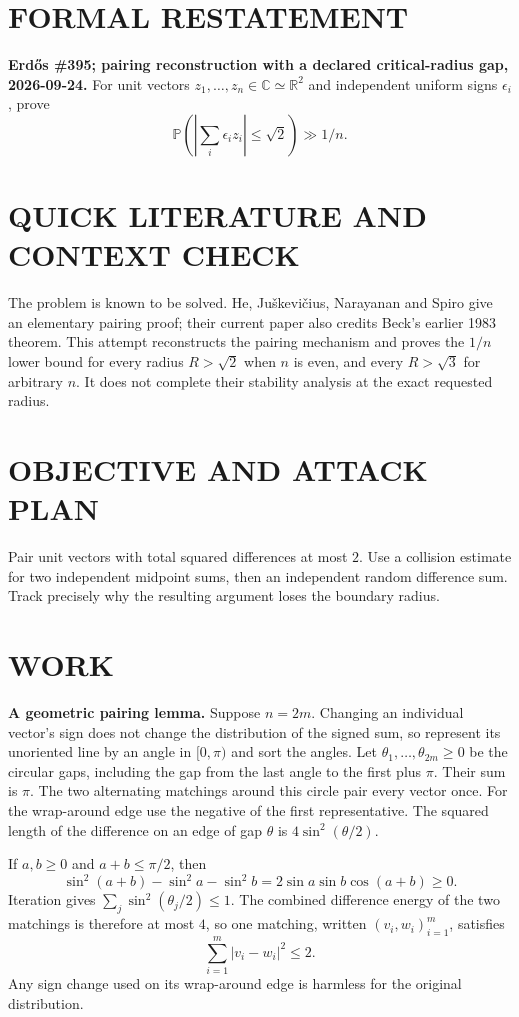 \section{FORMAL RESTATEMENT}
\textbf{Erd\H{o}s \#395; pairing reconstruction with a declared critical-radius gap, 2026-09-24.}
For unit vectors $z_1,\ldots,z_n\in\mathbb C\simeq\mathbb R^2$ and independent uniform signs $\epsilon_i$, prove
\[
\mathbb P\!\left(\left|\sum_i\epsilon_i z_i\right|\leq\sqrt2\right)\gg1/n.
\]

\section{QUICK LITERATURE AND CONTEXT CHECK}
The problem is known to be solved. He, Ju\v skevi\v cius, Narayanan and Spiro give an elementary pairing proof; their current paper also credits Beck's earlier 1983 theorem. This attempt reconstructs the pairing mechanism and proves the $1/n$ lower bound for every radius $R>\sqrt2$ when $n$ is even, and every $R>\sqrt3$ for arbitrary $n$. It does not complete their stability analysis at the exact requested radius.

\section{OBJECTIVE AND ATTACK PLAN}
Pair unit vectors with total squared differences at most $2$. Use a collision estimate for two independent midpoint sums, then an independent random difference sum. Track precisely why the resulting argument loses the boundary radius.

\section{WORK}
\textbf{A geometric pairing lemma.} Suppose $n=2m$. Changing an individual vector's sign does not change the distribution of the signed sum, so represent its unoriented line by an angle in $[0,\pi)$ and sort the angles. Let $\theta_1,\ldots,\theta_{2m}\geq0$ be the circular gaps, including the gap from the last angle to the first plus $\pi$. Their sum is $\pi$. The two alternating matchings around this circle pair every vector once. For the wrap-around edge use the negative of the first representative. The squared length of the difference on an edge of gap $\theta$ is $4\sin^2(\theta/2)$.

If $a,b\geq0$ and $a+b\leq\pi/2$, then
\[
\sin^2(a+b)-\sin^2a-\sin^2b=2\sin a\sin b\cos(a+b)\geq0.
\]
Iteration gives $\sum_j\sin^2(\theta_j/2)\leq1$. The combined difference energy of the two matchings is therefore at most $4$, so one matching, written $(v_i,w_i)_{i=1}^m$, satisfies
\[
\sum_{i=1}^m|v_i-w_i|^2\leq2.                            \tag{1}
\]
Any sign change used on its wrap-around edge is harmless for the original distribution.

